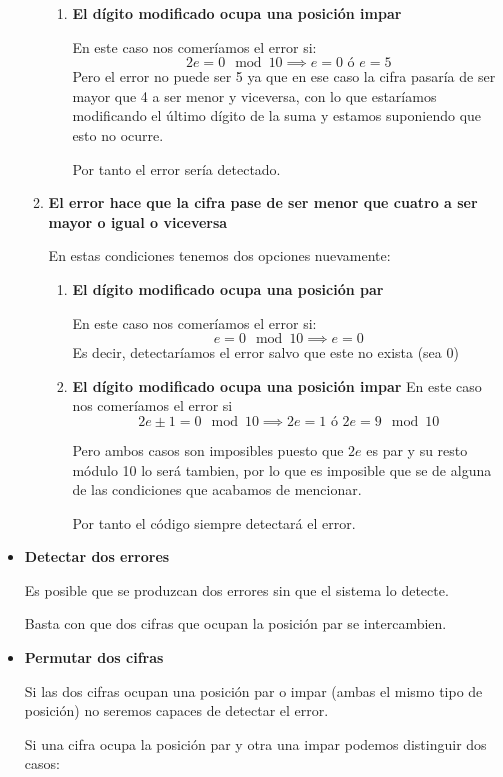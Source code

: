 \begin{problem}[5]
\begin{itemize}
\begin{enumerate}
\begin{enumerate}
\item \textbf{El dígito modificado ocupa una posición impar}

En este caso nos comeríamos el error si:
\[2e = 0 \mod 10 \implies e=0 \text{ ó } e=5\]
Pero el error no puede ser 5 ya que en ese caso la cifra pasaría de ser mayor que 4 a ser menor y viceversa, con lo que estaríamos modificando el último dígito de la suma y estamos suponiendo que esto no ocurre.

Por tanto el error sería detectado.
\end{enumerate}

\item \textbf{El error hace que la cifra pase de ser menor que cuatro a ser mayor o igual o viceversa}

En estas condiciones tenemos dos opciones nuevamente:
\begin{enumerate}
\item \textbf{El dígito modificado ocupa una posición par}

En este caso nos comeríamos el error si:
\[e=0 \mod 10 \implies e=0\]
Es decir, detectaríamos el error salvo que este no exista (sea 0)

\item \textbf{El dígito modificado ocupa una posición impar}
En este caso nos comeríamos el error si
\[2e \pm 1 = 0 \mod 10 \implies 2e=1 \text{ ó } 2e = 9 \mod 10\]

Pero ambos casos son imposibles puesto que $2e$ es par y su resto módulo 10 lo será tambien, por lo que es imposible que se de alguna de las condiciones que acabamos de mencionar.

Por tanto el código siempre detectará el error.
\end{enumerate}
\end{enumerate}

\item \textbf{Detectar dos errores}

Es posible que se produzcan dos errores sin que el sistema lo detecte.

Basta con que dos cifras que ocupan la posición par se intercambien.

\item \textbf{Permutar dos cifras}

Si las dos cifras ocupan una posición par o impar (ambas el mismo tipo de posición) no seremos capaces de detectar el error.

Si una cifra ocupa la posición par y otra una impar podemos distinguir dos casos:


\end{itemize}
\end{problem}
